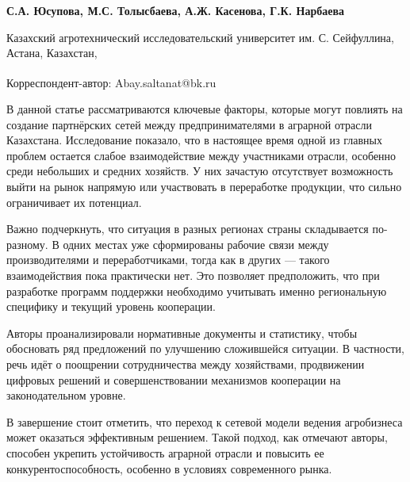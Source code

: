 
\begin{articleheader}

{\bfseries
С.А. Юсупова,
М.С. Толысбаева,
А.Ж. Касенова,
Г.К. Нарбаева
}
\end{articleheader}

\begin{affiliation}
Казахский агротехнический исследовательский университет им. С. Сейфуллина, Астана, Казахстан,

\raggedright \textsuperscript{\envelope }Корреспондент-автор: Abay.saltanat@bk.ru
\end{affiliation}

В данной статье рассматриваются ключевые факторы, которые могут повлиять
на создание партнёрских сетей между предпринимателями в аграрной отрасли
Казахстана. Исследование показало, что в настоящее время одной из
главных проблем остается слабое взаимодействие между участниками
отрасли, особенно среди небольших и средних хозяйств. У них зачастую
отсутствует возможность выйти на рынок напрямую или участвовать в
переработке продукции, что сильно ограничивает их потенциал.

Важно подчеркнуть, что ситуация в разных регионах страны складывается
по-разному. В одних местах уже сформированы рабочие связи между
производителями и переработчиками, тогда как в других --- такого
взаимодействия пока практически нет. Это позволяет предположить, что при
разработке программ поддержки необходимо учитывать именно региональную
специфику и текущий уровень кооперации.

Авторы проанализировали нормативные документы и статистику, чтобы
обосновать ряд предложений по улучшению сложившейся ситуации. В
частности, речь идёт о поощрении сотрудничества между хозяйствами,
продвижении цифровых решений и совершенствовании механизмов кооперации
на законодательном уровне.

В завершение стоит отметить, что переход к сетевой модели ведения
агробизнеса может оказаться эффективным решением. Такой подход, как
отмечают авторы, способен укрепить устойчивость аграрной отрасли и
повысить ее конкурентоспособность, особенно в условиях современного
рынка.

